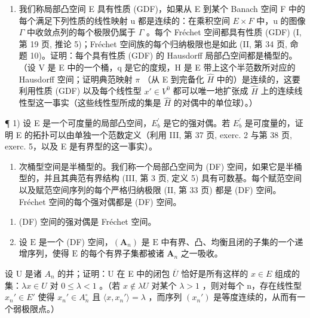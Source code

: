 \begin{enumerate}
\def\labelenumi{\arabic{enumi})}
\setcounter{enumi}{25}
\tightlist
\item
  我们称局部凸空间 E 具有性质 (GDF)，如果从 E 到某个 Banach 空间 F 中的每个满足下列性质的线性映射 u 都是连续的：在乘积空间 \(E \times F\) 中，u 的图像 \(\Gamma\) 中收敛点列的每个极限仍属于 \(\Gamma\) 。每个 Fréchet 空间都具有性质 (GDF) (I, 第 19 页, 推论 5)；Fréchet 空间族的每个归纳极限也是如此 (II, 第 34 页, 命题 10)。证明：每个具有性质 (GDF) 的 Hausdorff 局部凸空间都是桶型的。（设 V 是 E 中的一个桶，q 是它的度规，H 是 E 带上这个半范数所对应的 Hausdorff 空间；证明典范映射 \(\pi\) （从 E 到完备化 \(\hat{H}\) 中的）是连续的，这要利用性质 (GDF) 以及每个线性型 \(x' \in V^{0}\) 都可以唯一地扩张成 \(\hat{H}\) 上的连续线性型这一事实（这些线性型所成的集是 \(\hat{H}\) 的对偶中的单位球）。）
\end{enumerate}

\exercisegroup

¶ 1) 设 E 是一个可度量的局部凸空间，\(E_{b}^{\prime}\) 是它的强对偶。若 \(E_{b}^{\prime}\) 是可度量的，证明 E 的拓扑可以由单独一个范数定义（利用 III, 第 37 页, exerc. 2 与第 38 页, exerc. 5，以及 E 是有界型的这一事实）。

\begin{enumerate}
\def\labelenumi{\arabic{enumi})}
\setcounter{enumi}{1}
\tightlist
\item
  次桶型空间是半桶型的。我们称一个局部凸空间为 (DF) 空间，如果它是半桶型的，并且其典范有界结构 (III, 第 3 页, 定义 5) 具有可数基。每个赋范空间以及赋范空间序列的每个严格归纳极限 (II, 第 33 页) 都是 (DF) 空间。Fréchet 空间的每个强对偶都是 (DF) 空间。
\end{enumerate}

\begin{enumerate}
\def\labelenumi{\alph{enumi})}
\item
  (DF) 空间的强对偶是 Fréchet 空间。
\item
  设 \(\mathrm{E}\) 是一个 (DF) 空间，\((\mathbf{A}_n)\) 是 \(\mathrm{E}\) 中有界、凸、均衡且闭的子集的一个递增序列，使得 \(\mathrm{E}\) 的每个有界子集都被诸 \(\mathbf{A}_n\) 之一吸收。
\end{enumerate}

  设 U 是诸 \(A_{n}\) 的并；证明：U 在 E 中的闭包 \(\overline{U}\) 恰好是所有这样的 \(x \in E\) 组成的集：\(\lambda x \in U\) 对 \(0 \leqslant \lambda < 1\) 。（若 \(x \notin \lambda U\) 对某个 \(\lambda > 1\) ，则对每个 n，存在线性型 \(x_{n}' \in E'\) 使得 \(x_{n}' \in A_{n}^{\circ}\) 且 \(\langle x, x_{n}' \rangle = \lambda\) ，而序列 \((x_{n}')\) 是等度连续的，从而有一个弱极限点。）

